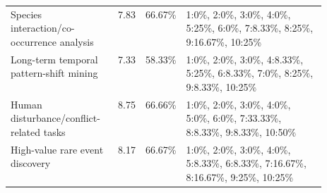 \begin{table}[h]
\begin{tabularx}{\textwidth}{p{0.34\linewidth}p{0.08\linewidth}p{0.10\linewidth}X}
Species interaction/co-occurrence analysis & 7.83 & 66.67\% & 1:0\%, 2:0\%, 3:0\%, 4:0\%, 5:25\%, 6:0\%, 7:8.33\%, 8:25\%, 9:16.67\%, 10:25\% \\
Long-term temporal pattern-shift mining & 7.33 & 58.33\% & 1:0\%, 2:0\%, 3:0\%, 4:8.33\%, 5:25\%, 6:8.33\%, 7:0\%, 8:25\%, 9:8.33\%, 10:25\% \\
Human disturbance/conflict-related tasks & 8.75 & 66.66\% & 1:0\%, 2:0\%, 3:0\%, 4:0\%, 5:0\%, 6:0\%, 7:33.33\%, 8:8.33\%, 9:8.33\%, 10:50\% \\
High-value rare event discovery & 8.17 & 66.67\% & 1:0\%, 2:0\%, 3:0\%, 4:0\%, 5:8.33\%, 6:8.33\%, 7:16.67\%, 8:16.67\%, 9:25\%, 10:25\% \\
\bottomrule
\end{tabularx}
\end{table}

